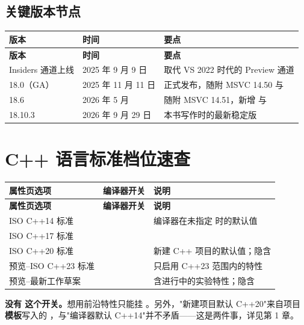 \subsection{关键版本节点}

\begin{longtable}{L{3.4cm}L{3.2cm}L{8.0cm}}
\toprule
\textbf{版本} & \textbf{时间} & \textbf{要点} \\
\midrule
\endfirsthead
\toprule
\textbf{版本} & \textbf{时间} & \textbf{要点} \\
\midrule
\endhead
\bottomrule
\endlastfoot
Insiders 通道上线 & 2025 年 9 月 9 日 & 取代 VS 2022 时代的 Preview 通道 \\
18.0（GA） & 2025 年 11 月 11 日 & 正式发布，随附 MSVC 14.50 与  \\
18.6 & 2026 年 5 月 & 随附 MSVC 14.51，新增  与  \\
18.10.3 & 2026 年 9 月 29 日 & 本书写作时的最新稳定版 \\
\end{longtable}

\section{C++ 语言标准档位速查}

\begin{longtable}{L{3.2cm}L{3.4cm}L{7.6cm}}
\toprule
\textbf{属性页选项} & \textbf{编译器开关} & \textbf{说明} \\
\midrule
\endfirsthead
\toprule
\textbf{属性页选项} & \textbf{编译器开关} & \textbf{说明} \\
\midrule
\endhead
\bottomrule
\endlastfoot
ISO C++14 标准 &  & 编译器在未指定  时的默认值 \\
ISO C++17 标准 &  & \\
ISO C++20 标准 &  & 新建 C++ 项目的默认值；隐含  \\
预览--ISO C++23 标准 &  & 只启用 C++23 范围内的特性 \\
预览--最新工作草案 &  & 含进行中的实验特性；隐含  \\
\end{longtable}

\begin{warnbox}[注意]
\textbf{没有  这个开关。}想用前沿特性只能挂 。另外，"新建项目默认 C++20"来自项目\textbf{模板}写入的 ，与"编译器默认 C++14"并不矛盾——这是两件事，详见第 1 章。
\end{warnbox}

